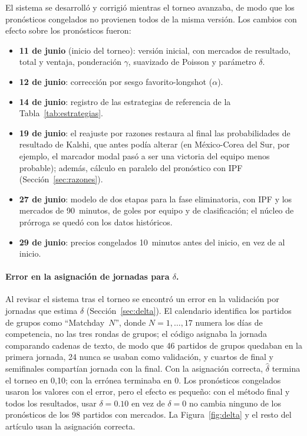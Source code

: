 \documentclass[12pt]{article}
\theoremstyle{plain}
\theoremstyle{remark}
\begin{document}
El sistema se desarrolló y corrigió mientras el torneo avanzaba, de
modo que los pronósticos congelados no provienen todos de la misma
versión.
Los cambios con efecto sobre los pronósticos fueron:
\begin{itemize}
  \item \textbf{11 de junio} (inicio del torneo): versión inicial, con
    mercados de resultado, total y ventaja, ponderación $\gamma$,
    suavizado de Poisson y parámetro $\delta$.
  \item \textbf{12 de junio}: corrección por sesgo favorito-longshot
    ($\alpha$).
  \item \textbf{14 de junio}: registro de las estrategias de referencia
    de la Tabla~\ref{tab:estrategias}.
  \item \textbf{19 de junio}: el reajuste por razones restaura al final
    las probabilidades de resultado de Kalshi, que antes podía alterar
    (en México-Corea del Sur, por ejemplo, el marcador modal pasó a ser
    una victoria del equipo menos probable); además, cálculo en
    paralelo del pronóstico con IPF (Sección~\ref{sec:razones}).
  \item \textbf{27 de junio}: modelo de dos etapas para la fase
    eliminatoria, con IPF y los mercados de 90~minutos, de goles por
    equipo y de clasificación; el núcleo de prórroga se quedó con los
    datos históricos.
  \item \textbf{29 de junio}: precios congelados 10~minutos antes del
    inicio, en vez de al inicio.
\end{itemize}

\paragraph{Error en la asignación de jornadas para $\delta$.}
Al revisar el sistema tras el torneo se encontró un error en la
validación por jornadas que estima $\delta$
(Sección~\ref{sec:delta}).
El calendario identifica los partidos de grupos como ``Matchday~$N$'',
donde $N = 1, \ldots, 17$ numera los días de competencia, no las
tres rondas de grupos; el código asignaba la jornada comparando
cadenas de texto, de modo que 46 partidos de grupos quedaban en la
primera jornada, 24 nunca se usaban como validación, y cuartos de
final y semifinales compartían jornada con la final.
Con la asignación correcta, $\hat\delta$ termina el torneo en 0,10;
con la errónea terminaba en 0.
Los pronósticos congelados usaron los valores con el error, pero el
efecto es pequeño: con el método final y todos los resultados, usar
$\delta = 0.10$ en vez de $\delta = 0$ no cambia ninguno de los
pronósticos de los 98 partidos con mercados.
La Figura~\ref{fig:delta} y el resto del artículo usan la asignación
correcta.
\end{document}
